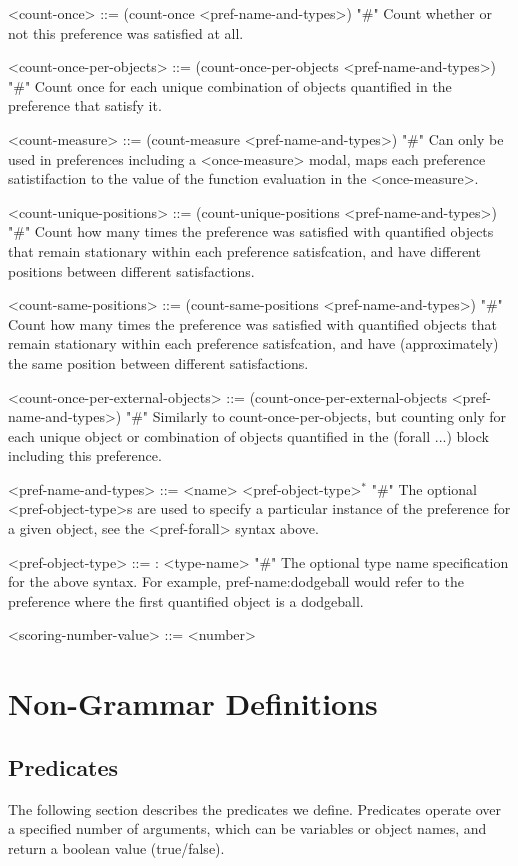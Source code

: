 \documentclass{article}
\begin{document}
\begin{grammar}
<count-once> ::= (count-once <pref-name-and-types>) "#" Count whether or not this preference was satisfied at all.

<count-once-per-objects> ::= (count-once-per-objects <pref-name-and-types>) "#" Count once for each unique combination of objects quantified in the preference that satisfy it.

<count-measure> ::= (count-measure <pref-name-and-types>) "#" Can only be used in preferences including a <once-measure> modal, maps each preference satistifaction to the value of the function evaluation in the <once-measure>.

<count-unique-positions> ::= (count-unique-positions <pref-name-and-types>) "#" Count how many times the preference was satisfied with quantified objects that remain stationary within each preference satisfcation, and have different positions between different satisfactions.

<count-same-positions> ::= (count-same-positions <pref-name-and-types>) "#" Count how many times the preference was satisfied with quantified objects that remain stationary within each preference satisfcation, and have (approximately) the same position between different satisfactions.

<count-once-per-external-objects> ::=  (count-once-per-external-objects <pref-name-and-types>) "#" Similarly to count-once-per-objects, but counting only for each unique object or combination of objects quantified in the (forall ...) block including this preference.

<pref-name-and-types> ::= <name> <pref-object-type>$^*$ "#" The optional <pref-object-type>s are used to specify a particular instance of the preference for a given object, see the <pref-forall> syntax above.

    <pref-object-type> ::= : <type-name>  "#" The optional type name specification for the above syntax. For example, pref-name:dodgeball would refer to the preference where the first quantified object is a dodgeball.

    <scoring-number-value> ::= <number>




\end{grammar}



\section{Non-Grammar Definitions}


\subsection{Predicates} \label{sec:predicates}
The following section describes the predicates we define.
        Predicates operate over a specified number of arguments, which can be variables or object names, and return a boolean value (true/false).
\end{document}
